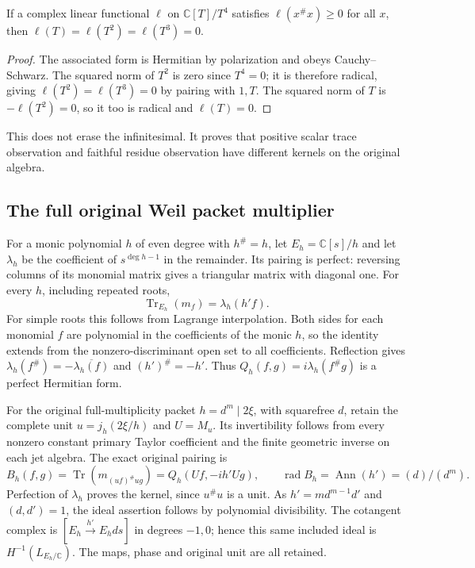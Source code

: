 \documentclass[11pt,a4paper]{article}
\theoremstyle{definition}\newtheorem{definition}[theorem]{Definition}\newtheorem{remark}[theorem]{Remark}
\newcommand{\C}{\mathbb C}\newcommand{\R}{\mathbb R}\newcommand{\Z}{\mathbb Z}\newcommand{\B}{\mathbb B}
\newcommand{\Tr}{\operatorname{Tr}}\newcommand{\im}{\operatorname{im}}\newcommand{\diag}{\operatorname{diag}}\newcommand{\rad}{\operatorname{rad}}\newcommand{\Spec}{\operatorname{Spec}}\newcommand{\Ann}{\operatorname{Ann}}\newcommand{\Disc}{\operatorname{Disc}}\newcommand{\Hom}{\operatorname{Hom}}\newcommand{\Res}{\operatorname{Res}}
\begin{document}
\begin{proposition}
If a complex linear functional $\ell$ on $\C[T]/T^4$ satisfies $\ell(x^\#x)\ge0$ for all $x$, then $\ell(T)=\ell(T^2)=\ell(T^3)=0$.
\end{proposition}
\begin{proof}
The associated form is Hermitian by polarization and obeys Cauchy--Schwarz. The squared norm of $T^2$ is zero since $T^4=0$; it is therefore radical, giving $\ell(T^2)=\ell(T^3)=0$ by pairing with $1,T$. The squared norm of $T$ is $-\ell(T^2)=0$, so it too is radical and $\ell(T)=0$.
\end{proof}
This does not erase the infinitesimal. It proves that positive scalar trace observation and faithful residue observation have different kernels on the original algebra.

\subsection{The full original Weil packet multiplier}
For a monic polynomial $h$ of even degree with $h^\#=h$, let $E_h=\C[s]/h$ and let $\lambda_h$ be the coefficient of $s^{\deg h-1}$ in the remainder. Its pairing is perfect: reversing columns of its monomial matrix gives a triangular matrix with diagonal one. For every $h$, including repeated roots,
\begin{equation}
 \Tr_{E_h}(m_f)=\lambda_h(h'f).                           \label{eq:monictrace}
\end{equation}
For simple roots this follows from Lagrange interpolation. Both sides for each monomial $f$ are polynomial in the coefficients of the monic $h$, so the identity extends from the nonzero-discriminant open set to all coefficients. Reflection gives $\lambda_h(f^\#)=-\overline{\lambda_h(f)}$ and $(h')^\#=-h'$. Thus $Q_h(f,g)=i\lambda_h(f^\#g)$ is a perfect Hermitian form.

For the original full-multiplicity packet $h=d^m\mid2\xi$, with squarefree $d$, retain the complete unit $u=j_h(2\xi/h)$ and $U=M_u$. Its invertibility follows from every nonzero constant primary Taylor coefficient and the finite geometric inverse on each jet algebra. The exact original pairing is
\begin{equation}
 B_h(f,g)=\Tr(m_{(uf)^\#ug})
 =Q_h(Uf,-ih'Ug),\qquad
 \rad B_h=\Ann(h')=(d)/(d^m).                            \label{eq:packet}
\end{equation}
Perfection of $\lambda_h$ proves the kernel, since $u^\#u$ is a unit. As $h'=md^{m-1}d'$ and $(d,d')=1$, the ideal assertion follows by polynomial divisibility. The cotangent complex is $[E_h\xrightarrow{h'}E_hds]$ in degrees $-1,0$; hence this same included ideal is $H^{-1}(L_{E_h/\C})$. The maps, phase and original unit are all retained.
\end{document}
